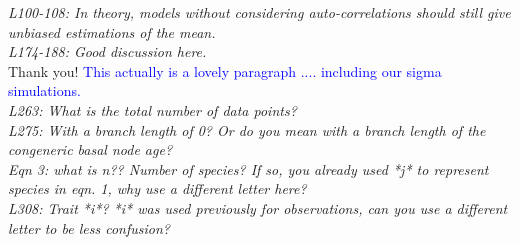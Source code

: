 \documentclass[11pt]{article}
\begin{document}
\emph{L100-108: In theory, models without considering auto-correlations should still give unbiased estimations of the mean.}\\

\emph{L174-188: Good discussion here.}\\

Thank you! \textcolor{blue}{This actually is a lovely paragraph .... including our sigma simulations.}\\

\emph{L263: What is the total number of data points?}\\
\emph{L275: With a branch length of 0? Or do you mean with a branch length of the congeneric basal node age?}\\
\emph{Eqn 3: what is n?? Number of species? If so, you already used *j* to represent species in eqn. 1, why use a different letter here?}\\
\emph{L308: Trait *i*? *i* was used previously for observations, can you use a different letter to be less confusion?}\\






\end{document}
